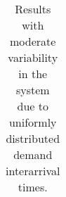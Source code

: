 \documentclass[envcountsame]{llncs}
\begin{document}
\begin{table}[tb]
\begin{center}
\begin{tabular}{crrrccccccc}
      \bottomrule
    \end{tabular}
  \end{center}
  \caption{\label{tbl:unif} Results with moderate variability in the system due to uniformly
    distributed demand interarrival times. }
\end{table}
\end{document}
